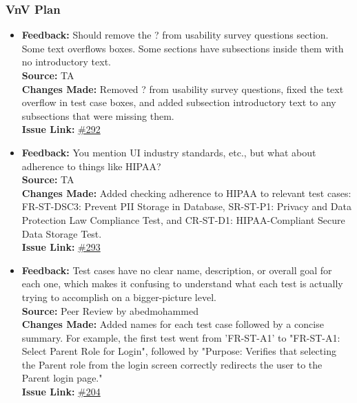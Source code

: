 \documentclass{article}
\begin{document}
\subsubsection{VnV Plan}

\begin{itemize}
    \item 
      \textbf{Feedback:} Should remove the ? from usability survey questions section. Some text overflows boxes. Some sections have subsections inside them with no introductory text.\\
      \textbf{Source:} TA \\
      \textbf{Changes Made:} Removed ? from usability survey questions, fixed the text overflow in test case boxes, and added subsection introductory text to any subsections that were missing them.\\
      \textbf{Issue Link:} \href{https://github.com/parishanizam/TeleHealth/issues/292}{\#292}

    \item 
      \textbf{Feedback:} You mention UI industry standards, etc., but what about adherence to things like HIPAA?\\
      \textbf{Source:} TA \\
      \textbf{Changes Made:} Added checking adherence to HIPAA to relevant test cases: FR-ST-DSC3: Prevent PII Storage in Database, SR-ST-P1: Privacy and Data Protection Law Compliance Test, and CR-ST-D1: HIPAA-Compliant Secure Data Storage Test. \\
      \textbf{Issue Link:} \href{https://github.com/parishanizam/TeleHealth/issues/293}{\#293}

    \item 
      \textbf{Feedback:} Test cases have no clear name, description, or overall goal for each one, which makes it confusing to understand what each test is actually trying to accomplish on a bigger-picture level. \\
      \textbf{Source:} Peer Review by abedmohammed \\
      \textbf{Changes Made:} Added names for each test case followed by a concise summary. For example, the first test went from 'FR-ST-A1' to "FR-ST-A1: Select Parent Role for Login", followed by "Purpose: Verifies that selecting the Parent role from the login screen correctly redirects the user to the Parent login page."\\
      \textbf{Issue Link:} \href{https://github.com/parishanizam/TeleHealth/issues/204}{\#204}


\end{itemize}
\end{document}
